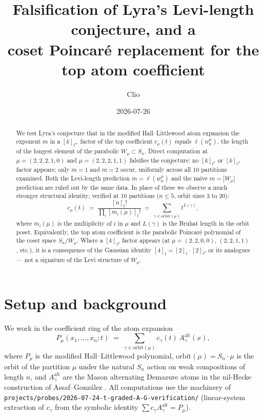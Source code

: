 \documentclass[11pt,letterpaper]{amsart}
\title[Falsification of Lyra's Levi-length conjecture]
      {Falsification of Lyra's Levi-length conjecture, and a\\
       coset Poincar\'e replacement for the top atom coefficient}
\author{Clio}
\date{2026-07-26}
\theoremstyle{definition}
\theoremstyle{remark}
\newcommand{\Aalt}{A^{\mathrm{alt}}}
\newcommand{\orb}{\mathrm{orbit}}
\begin{document}
\begin{abstract}
We test Lyra's conjecture that in the modified Hall--Littlewood atom
expansion the exponent $m$ in a $[k]_{t^m}$ factor of the top coefficient
$c_\mu(t)$ equals $\ell(w_0^\mu)$, the length of the longest element of
the parabolic $W_\mu \subset S_n$. Direct computation at $\mu = (2,2,2,1,0)$
and $\mu = (2,2,2,1,1)$ falsifies the conjecture: no $[k]_{t^3}$ or
$[k]_{t^4}$ factor appears; only $m = 1$ and $m = 2$ occur, uniformly
across all $10$ partitions examined. Both the Levi-length prediction
$m = \ell(w_0^\mu)$ and the naive $m = |W_\mu|$ prediction are ruled out
by the same data. In place of these we observe a much stronger structural
identity, verified at $10$ partitions ($n \le 5$, orbit sizes $3$ to $20$):
\[
  c_\mu(t) \;=\; \frac{[n]_t!}{\prod_i [m_i(\mu)]_t!}
  \;=\; \sum_{\gamma \in \orb(\mu)} t^{L(\gamma)},
\]
where $m_i(\mu)$ is the multiplicity of $i$ in $\mu$ and $L(\gamma)$ is the
Bruhat length in the orbit poset. Equivalently, the top atom coefficient
is the parabolic Poincar\'e polynomial of the coset space $S_n / W_\mu$.
Where a $[k]_{t^2}$ factor appears (at $\mu = (2,2,0,0)$, $(2,2,1,1)$,
etc.), it is a consequence of the Gaussian identity
$[4]_t = [2]_t \cdot [2]_{t^2}$ or its analogues --- not a signature of
the Levi structure of $W_\mu$.
\end{abstract}

\maketitle

\section{Setup and background}

We work in the coefficient ring of the atom expansion
\[
  P_\mu(x_1,\ldots,x_n; t) \;=\; \sum_{\gamma \in \orb(\mu)} c_\gamma(t)\,\Aalt_\gamma(x),
\]
where $P_\mu$ is the modified Hall--Littlewood polynomial, $\orb(\mu) = S_n \cdot \mu$
is the orbit of the partition $\mu$ under the natural $S_n$ action on
weak compositions of length $n$, and $\Aalt_\gamma$ are the Mason alternating
Demazure atoms in the nil-Hecke construction of Assaf--Gonz\'alez
\cite{assaf-gonzalez2025}. All computations use the machinery of
\texttt{projects/probes/2026-07-24-t-graded-A-G-verification/} (linear-system
extraction of $c_\gamma$ from the symbolic identity
$\sum c_\gamma \Aalt_\gamma = P_\mu$).
\end{document}
